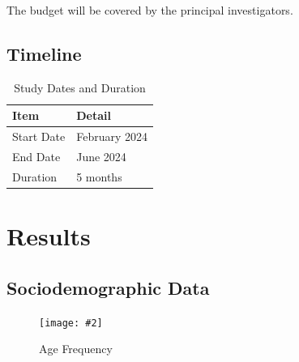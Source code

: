 \documentclass[jou]{apa7}
\newcommand{\includegraphicsmax}[2][]{%
	\texttt{[image: \#2]}%
}
\begin{document}
The budget will be covered by the principal investigators.

\subsection{Timeline}\label{cronograma}

\begin{table}[h!]
	\centering
	\begin{tabular}{@{}ll@{}}
		\toprule
		\textbf{Item}                & \textbf{Detail}     \\ \midrule
		Start Date              & February 2024         \\
		End Date        & June 2024           \\
		Duration                     & 5 months              \\ \bottomrule
	\end{tabular}
	\caption{Study Dates and Duration}
	\label{tab:fechas-duracion}
\end{table}

\section{Results}\label{resultados}

\subsection{Sociodemographic Data}

\begin{figure}[H]
	\centering
	\includegraphicsmax{freq.age.pdf}
	\caption{Age Frequency}
	\label{fig:Figure1}
\end{figure}
\end{document}

